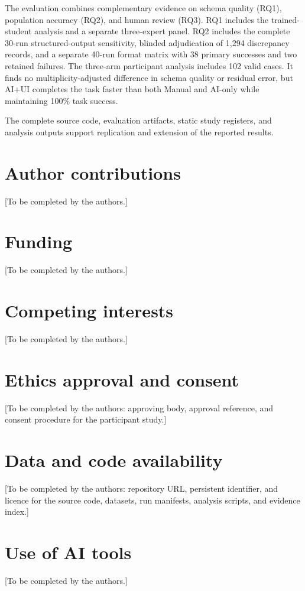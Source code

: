 \documentclass[11pt,a4paper]{article}
\begin{document}
The evaluation combines complementary evidence on schema quality (RQ1), population accuracy (RQ2), and human review (RQ3). RQ1 includes the trained-student analysis and a separate three-expert panel. RQ2 includes the complete 30-run structured-output sensitivity, blinded adjudication of 1,294 discrepancy records, and a separate 40-run format matrix with 38 primary successes and two retained failures. The three-arm participant analysis includes 102 valid cases. It finds no multiplicity-adjusted difference in schema quality or residual error, but AI+UI completes the task faster than both Manual and AI-only while maintaining 100\% task success.

The complete source code, evaluation artifacts, static study registers, and
analysis outputs support replication and extension of the reported results.

\section*{Author contributions}
[To be completed by the authors.]

\section*{Funding}
[To be completed by the authors.]

\section*{Competing interests}
[To be completed by the authors.]

\section*{Ethics approval and consent}
[To be completed by the authors: approving body, approval reference, and consent procedure for the participant study.]

\section*{Data and code availability}
[To be completed by the authors: repository URL, persistent identifier, and licence for the source code, datasets, run manifests, analysis scripts, and evidence index.]

\section*{Use of AI tools}
[To be completed by the authors.]



\end{document}
